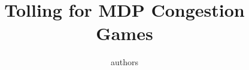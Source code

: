 \documentclass[conference]{IEEEtran}
\begin{document}
\title{Tolling for MDP Congestion Games}
\author{authors}
\maketitle










\end{document}
